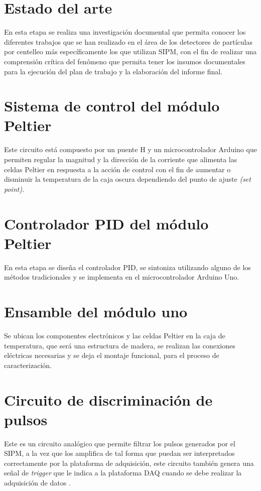 \documentclass[11pt,letterpaper,oneside]{book}
\begin{document}
\section{\textbf{Estado del arte}}
En esta etapa se realiza una investigación documental que permita conocer los diferentes trabajos que se han realizado en el área de los detectores de partículas por centelleo más específicamente los que utilizan SIPM, con el fin de realizar una comprensión crítica del fenómeno que permita tener los insumos documentales para la ejecución del plan de trabajo y la elaboración del informe final.  

	\section{\textbf{Sistema de control del módulo Peltier}}
Este circuito está compuesto por un puente H y un microcontrolador Arduino que permiten regular la magnitud y la dirección de la corriente que alimenta las celdas Peltier en respuesta a la acción de control con el fin de aumentar o disminuir la temperatura de la caja oscura dependiendo del punto de ajuste \textit{(set point)}.

	\section{\textbf{Controlador PID del módulo Peltier}}
En esta etapa se diseña el controlador PID, se sintoniza utilizando alguno de los métodos tradicionales y se implementa en el microcontrolador Arduino Uno.

	 \section{\textbf{Ensamble del módulo uno}}
Se ubican los componentes electrónicos y las celdas Peltier en la caja de temperatura, que será una estructura de madera, se realizan las conexiones eléctricas necesarias y se deja el montaje funcional, para el proceso de caracterización.
\section{\textbf{Circuito de discriminación de pulsos}}
Este es un circuito analógico que permite filtrar los pulsos generados por el SIPM, a la vez que los amplifica de tal forma que puedan ser interpretados correctamente por la plataforma de adquisición, este circuito también genera una señal de \textit{trigger} que le indica a la plataforma DAQ cuando se debe realizar la adquisición de datos \cite{Electronica_Amiga}.
\end{document}
